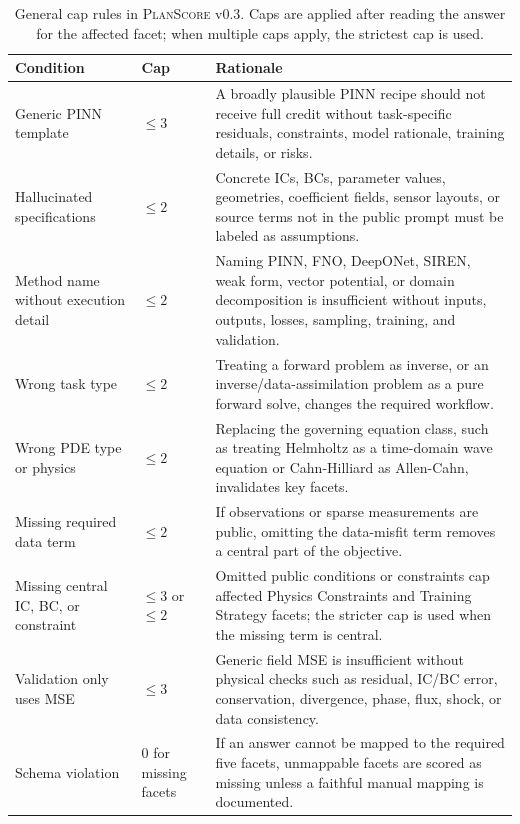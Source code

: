 \documentclass[11pt]{article}
\newcommand{\planscore}{\textsc{PlanScore}}
\begin{document}
\begin{table}[t]
\caption{General cap rules in \planscore{} v0.3. Caps are applied after reading the answer for the affected facet; when multiple caps apply, the strictest cap is used.}
\label{tab:appendix-general-caps}
\centering
\scriptsize
\begin{tabularx}{\textwidth}{@{}p{}p{}X@{}}
\toprule
\textbf{Condition} & \textbf{Cap} & \textbf{Rationale} \\
\midrule
Generic PINN template & $\leq 3$ & A broadly plausible PINN recipe should not receive full credit without task-specific residuals, constraints, model rationale, training details, or risks. \\
Hallucinated specifications & $\leq 2$ & Concrete ICs, BCs, parameter values, geometries, coefficient fields, sensor layouts, or source terms not in the public prompt must be labeled as assumptions. \\
Method name without execution detail & $\leq 2$ & Naming PINN, FNO, DeepONet, SIREN, weak form, vector potential, or domain decomposition is insufficient without inputs, outputs, losses, sampling, training, and validation. \\
Wrong task type & $\leq 2$ & Treating a forward problem as inverse, or an inverse/data-assimilation problem as a pure forward solve, changes the required workflow. \\
Wrong PDE type or physics & $\leq 2$ & Replacing the governing equation class, such as treating Helmholtz as a time-domain wave equation or Cahn-Hilliard as Allen-Cahn, invalidates key facets. \\
Missing required data term & $\leq 2$ & If observations or sparse measurements are public, omitting the data-misfit term removes a central part of the objective. \\
Missing central IC, BC, or constraint & $\leq 3$ or $\leq 2$ & Omitted public conditions or constraints cap affected Physics Constraints and Training Strategy facets; the stricter cap is used when the missing term is central. \\
Validation only uses MSE & $\leq 3$ & Generic field MSE is insufficient without physical checks such as residual, IC/BC error, conservation, divergence, phase, flux, shock, or data consistency. \\
Schema violation & 0 for missing facets & If an answer cannot be mapped to the required five facets, unmappable facets are scored as missing unless a faithful manual mapping is documented. \\
\bottomrule
\end{tabularx}
\end{table}
\end{document}
